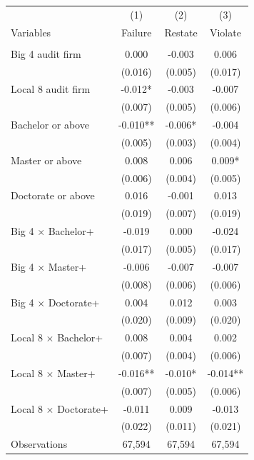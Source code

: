 \documentclass[10pt]{article}
\begin{document}
\begin{minipage}{19cm}\fontsize{10}{12}\selectfont\setlength{\tabcolsep}{4pt}\renewcommand{\arraystretch}{1.12}


\centering
{}
\begin{threeparttable}
\begin{tabular}{p{}ccc}
\toprule
 & (1) & (2) & (3) \\
Variables & Failure & Restate & Violate \\
\midrule
\addlinespace
\multicolumn{4}{l}{\textbf{Panel A: Cumulative degree thresholds (base: below bachelor)}} \\
Big 4 audit firm & 0.000 & -0.003 & 0.006 \\
 & (0.016) & (0.005) & (0.017) \\
Local 8 audit firm & -0.012* & -0.003 & -0.007 \\
 & (0.007) & (0.005) & (0.006) \\
Bachelor or above & -0.010** & -0.006* & -0.004 \\
 & (0.005) & (0.003) & (0.004) \\
Master or above & 0.008 & 0.006 & 0.009* \\
 & (0.006) & (0.004) & (0.005) \\
Doctorate or above & 0.016 & -0.001 & 0.013 \\
 & (0.019) & (0.007) & (0.019) \\
Big 4 $\times$ Bachelor+ & -0.019 & 0.000 & -0.024 \\
 & (0.017) & (0.005) & (0.017) \\
Big 4 $\times$ Master+ & -0.006 & -0.007 & -0.007 \\
 & (0.008) & (0.006) & (0.006) \\
Big 4 $\times$ Doctorate+ & 0.004 & 0.012 & 0.003 \\
 & (0.020) & (0.009) & (0.020) \\
Local 8 $\times$ Bachelor+ & 0.008 & 0.004 & 0.002 \\
 & (0.007) & (0.004) & (0.006) \\
Local 8 $\times$ Master+ & -0.016** & -0.010* & -0.014** \\
 & (0.007) & (0.005) & (0.006) \\
Local 8 $\times$ Doctorate+ & -0.011 & 0.009 & -0.013 \\
 & (0.022) & (0.011) & (0.021) \\
Observations & 67,594 & 67,594 & 67,594 \\

\end{tabular}
\end{threeparttable}
\end{minipage}
\end{document}
